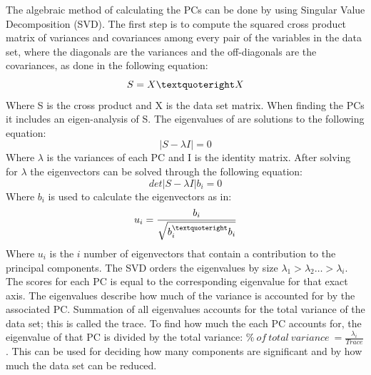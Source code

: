 The algebraic method of calculating the PCs can be done by using Singular Value Decomposition (SVD). The first step is to compute the squared cross product matrix of variances and covariances among every pair of the variables in the data set, where the diagonals are the variances and the off-diagonals are the covariances, as done in the following equation:
\begin{equation}
S = X \textquoteright X
\end{equation}
Where S is the cross product and X is the data set matrix. When finding the PCs it includes an eigen-analysis of S. The eigenvalues of are solutions to the following equation:
\begin{equation}
| S - \lambda I |  = 0
\end{equation}
Where $\lambda$ is the variances of each PC and I is the identity matrix. After solving for $\lambda$ the eigenvectors can be solved through the following equation:
\begin{equation}
det | S - \lambda I | b_{i} = 0
\end{equation}
Where $b_{i}$ is used to calculate the eigenvectors as in:
\begin{eqnarray}
u_{i} = \frac{b_{i}}{\sqrt{b_{i}^{\textquoteright} b_{i}}}
\end{eqnarray}
Where $u_{i}$ is the $i$ number of eigenvectors that contain a contribution to the principal components.
The SVD orders the eigenvalues by size $\lambda_{1} > \lambda_{2} … > \lambda_{i}$. The scores for each PC is equal to the corresponding eigenvalue for that exact axis. The eigenvalues describe how much of the variance is accounted for by the associated PC. Summation of all eigenvalues accounts for the total variance of the data set; this is called the trace. To find how much the each PC accounts for, the eigenvalue of that PC is divided by the total variance: $\%~ of~ total~ variance~ = \frac{\lambda_{i}}{Trace}$. This can be used for deciding how many components are significant and by how much the data set can be reduced. \cite{Semmlow2004}
%
%


